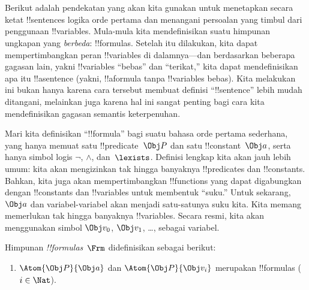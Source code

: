 \documentclass[../../../include/open-logic-section]{subfiles}
\begin{document}

\section{}

Berikut adalah pendekatan yang akan kita gunakan untuk menetapkan secara
ketat !!{sentence}s logika orde pertama dan menangani persoalan yang timbul
dari penggunaan !!{variable}s. Mula-mula kita mendefinisikan suatu himpunan
ungkapan yang \emph{berbeda}: !!{formula}s. Setelah itu dilakukan, kita dapat
mempertimbangkan peran !!{variable}s di dalamnya---dan berdasarkan beberapa
gagasan lain, yakni !!{variable}s ``bebas'' dan ``terikat,'' kita dapat
mendefinisikan apa itu !!a{sentence} (yakni, !!a{formula} tanpa
!!{variable}s bebas). Kita melakukan ini bukan hanya karena cara tersebut
membuat definisi ``!!{sentence}'' lebih mudah ditangani, melainkan juga karena
hal ini sangat penting bagi cara kita mendefinisikan gagasan semantis
keterpenuhan.

Mari kita definisikan ``!!{formula}'' bagi suatu bahasa orde pertama
sederhana, yang hanya memuat satu !!{predicate}~$\Obj P$ dan satu
!!{constant}~$\Obj a$, serta hanya simbol logis $\lnot$, $\land$,
dan~$\lexists$. Definisi lengkap kita akan jauh lebih umum: kita akan
mengizinkan tak hingga banyaknya !!{predicate}s dan !!{constant}s. Bahkan,
kita juga akan mempertimbangkan !!{function}s yang dapat digabungkan dengan
!!{constant}s dan !!{variable}s untuk membentuk ``suku.'' Untuk sekarang,
$\Obj a$ dan variabel-variabel akan menjadi satu-satunya suku kita. Kita
memang memerlukan tak hingga banyaknya !!{variable}s. Secara resmi, kita akan
menggunakan simbol $\Obj v_0$, $\Obj v_1$, \dots, sebagai variabel.

\begin{defn}
Himpunan \emph{!!{formula}s}~$\Frm$ didefinisikan sebagai berikut:
\begin{enumerate}
\item{} $\Atom{\Obj P}{\Obj a}$ dan $\Atom{\Obj
  P}{\Obj v_i}$ merupakan !!{formula}s ($i \in \Nat$).




\end{enumerate}
\end{defn}
\end{document}
